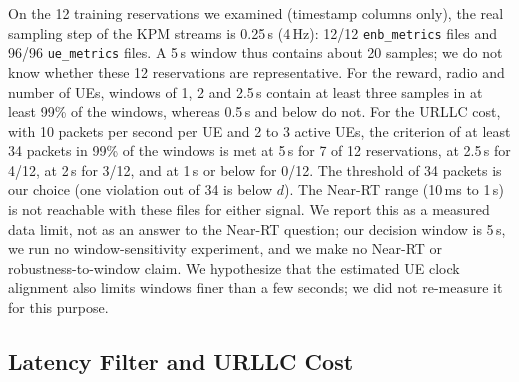 On the 12 training reservations we examined (timestamp columns only), the real sampling step of the KPM streams is 0.25\,s (4\,Hz): 12/12 \texttt{enb\_metrics} files and 96/96 \texttt{ue\_metrics} files.%
A 5\,s window thus contains about 20 samples; we do not know whether these 12 reservations are representative.%
For the reward, radio and number of UEs, windows of 1, 2 and 2.5\,s contain at least three samples in at least 99\% of the windows, whereas 0.5\,s and below do not.%
For the URLLC cost, with 10 packets per second per UE and 2 to 3 active UEs, the criterion of at least 34 packets in 99\% of the windows is met at 5\,s for 7 of 12 reservations, at 2.5\,s for 4/12, at 2\,s for 3/12, and at 1\,s or below for 0/12.%
The threshold of 34 packets is our choice (one violation out of 34 is below $d$).%
The Near-RT range (10\,ms to 1\,s)~\cite{TODO-oran-timescales} is not reachable with these files for either signal.%
We report this as a measured data limit, not as an answer to the Near-RT question; our decision window is 5\,s, we run no window-sensitivity experiment, and we make no Near-RT or robustness-to-window claim.%
We hypothesize that the estimated UE clock alignment also limits windows finer than a few seconds; we did not re-measure it for this purpose.%

\subsection{Latency Filter and URLLC Cost}
\label{sec:latency}

